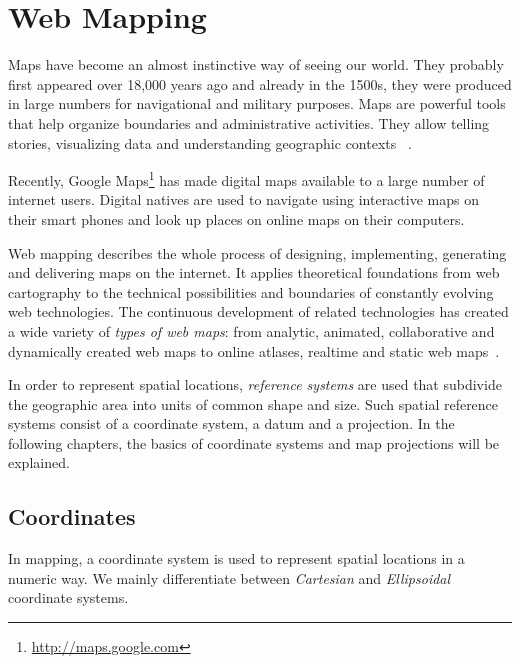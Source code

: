 
%
%

\section{Web Mapping}

Maps have become an almost instinctive way of seeing our world. They probably first appeared over 18,000 years ago and already in the 1500s, they were produced in large numbers for navigational and military purposes. Maps are powerful tools that help organize boundaries and administrative activities. They allow telling stories, visualizing data and understanding geographic contexts
~\cite{Zzolo11mappingdrupal}.

Recently, Google Maps\footnote{\url{http://maps.google.com}} has made digital maps available to a large number of internet users. Digital natives are used to navigate using interactive maps on their smart phones and look up places on online maps on their computers.

Web mapping describes the whole process of designing, implementing, generating and delivering maps on the internet. It applies theoretical foundations from web cartography to the technical possibilities and boundaries of constantly evolving web technologies. The continuous development of related technologies has created a wide variety of \textit{types of web maps}: from analytic, animated, collaborative and dynamically created web maps to online atlases, realtime and static web maps~\cite{wiki:web-mapping}.

In order to represent spatial locations, \textit{reference systems} are used that subdivide the geographic area into units of common shape and size. Such spatial reference systems consist of a coordinate system, a datum and a projection. In the following chapters, the basics of coordinate systems and map projections will be explained.

\subsection{Coordinates}

In mapping, a coordinate system is used to represent spatial locations in a numeric way. We mainly differentiate between \textit{Cartesian} and \textit{Ellipsoidal} coordinate systems. 

